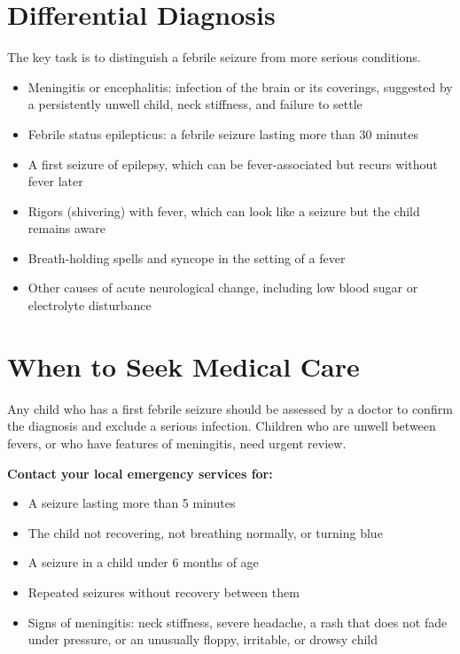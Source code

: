 \section*{Differential Diagnosis}
The key task is to distinguish a febrile seizure from more serious conditions.
\begin{itemize}
    \item Meningitis or encephalitis: infection of the brain or its coverings, suggested by a persistently unwell child, neck stiffness, and failure to settle
    \item Febrile status epilepticus: a febrile seizure lasting more than 30 minutes
    \item A first seizure of epilepsy, which can be fever-associated but recurs without fever later
    \item Rigors (shivering) with fever, which can look like a seizure but the child remains aware
    \item Breath-holding spells and syncope in the setting of a fever
    \item Other causes of acute neurological change, including low blood sugar or electrolyte disturbance
\end{itemize}

\section*{When to Seek Medical Care}
Any child who has a first febrile seizure should be assessed by a doctor to confirm the diagnosis and exclude a serious infection. Children who are unwell between fevers, or who have features of meningitis, need urgent review.

\textbf{Contact your local emergency services for:}
\begin{itemize}
    \item A seizure lasting more than 5 minutes
    \item The child not recovering, not breathing normally, or turning blue
    \item A seizure in a child under 6 months of age
    \item Repeated seizures without recovery between them
    \item Signs of meningitis: neck stiffness, severe headache, a rash that does not fade under pressure, or an unusually floppy, irritable, or drowsy child
\end{itemize}

